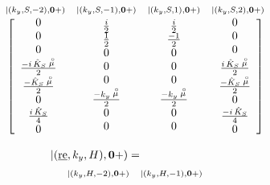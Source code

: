 \begin{figure}
{\begin{minipage} {145.0mm}
\begin{equation}
\begin{array}{cccc}
\scriptstyle|(k_y,S,-2),{\bf 0}+)&\scriptstyle|(k_y,S,-1),{\bf 0}+)&
\scriptstyle|(k_y,S,1),{\bf 0}+)&\scriptstyle|(k_y,S,2),{\bf 0}+)\\
\left[\begin{array}{c} 0\\0\\0\\{{-i \,{\hat{K}_{S}}\,\stackrel{\scriptscriptstyle _{\,\,\circ}}{ \mu}}\over 2}\\
  {{-{\hat{K}_{S}}\,\stackrel{\scriptscriptstyle _{\,\,\circ}}{ \mu} }\over 2}\\0\\{i\,{\hat{K}_{S}}\over 4}\\0
\end{array}\right.&
\begin{array}{c} {i\over 2}\\{1\over 2}\\0\\0\\0\\
  {{- k_y\,\stackrel{\scriptscriptstyle _{\,\,\circ}}{ \mu}  }\over 2}\\0\\0
\end{array}&
\begin{array}{c} {i\over 2}\\{{-1}\over 2}\\0\\0\\0\\
  {{- k_y\,\stackrel{\scriptscriptstyle _{\,\,\circ}}{ \mu}  }\over 2}\\0\\0
\end{array}&\left.
\begin{array}{c} 0\\0\\0\\{i\,{\hat{K}_{S}}\,\stackrel{\scriptscriptstyle _{\,\,\circ}}{ \mu}\over 2}\\
  {{-{\hat{K}_{S}}\,\stackrel{\scriptscriptstyle _{\,\,\circ}}{ \mu} }\over 2}\\0\\
  {{-i\,{\hat{K}_{S}}}\over 4}\\0
\end{array}\right]
\end{array}
\end{equation}
\begin{samepage}  
\begin{eqnarray} \label{H0rep}
\lefteqn{
|(\re,k_y,H),{\bf 0+})=}\\
&&\begin{array}{ccccc}
\scriptstyle|(k_y,H,-2),{\bf 0}+)&\scriptstyle|(k_y,H,-1),{\bf 0}+)&

\end{array}
\end{eqnarray}
\end{samepage}
\end{minipage}}
\end{figure}
